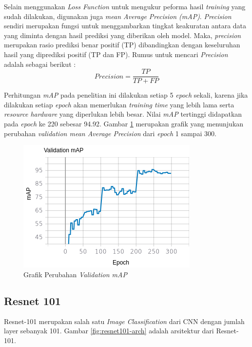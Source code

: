 Selain menggunakan \textit{Loss Function} untuk mengukur peforma hasil \textit{training} yang sudah dilakukan, digunakan juga \textit{mean Average Precision (mAP)}. \textit{Precision} sendiri merupakan fungsi untuk menggambarkan tingkat keakuratan antara data yang diminta dengan hasil prediksi yang diberikan oleh model. Maka, \textit{precision} merupakan rasio prediksi benar positif (TP) dibandingkan dengan keseluruhan hasil yang diprediksi positif (TP dan FP). Rumus untuk mencari \textit{Precision} adalah sebagai berikut :
\begin{equation}
	Precision = \frac{TP}{TP+FP} 
\end{equation}

Perhitungan \textit{mAP} pada penelitian ini dilakukan setiap 5 \textit{epoch} sekali, karena jika dilakukan setiap \textit{epoch} akan memerlukan \textit{training time} yang lebih lama serta \textit{resource hardware} yang diperlukan lebih besar. Nilai \textit{mAP} tertinggi didapatkan pada \textit{epoch} ke 220 sebesar 94.92. Gambar \ref{fig:resnet50-map} merupakan grafik yang menunjukan perubahan \textit{validation mean Average Precision} dari \textit{epoch} 1 sampai 300. 

\begin{figure}[h!]
	\centering
	\includegraphics[scale=0.7]{gambar/resnet50-map.png}
	\caption{Grafik Perubahan \textit{Validation mAP}}
	\label{fig:resnet50-map}
\end{figure}

\subsection{Resnet 101}
\label{resnet101}

Resnet-101 merupakan salah satu \textit{Image Classification} dari CNN dengan jumlah layer sebanyak 101. Gambar \ref{fig:resnet101-arch} adalah arsitektur dari Resnet-101.

